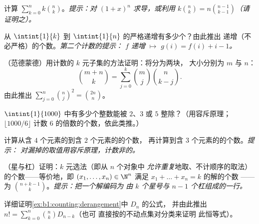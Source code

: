 \begin{exercise}[$\star$]\label{exo:b1:counting:5}
计算 $\sum_{k=0}^{n} k \binom{n}{k}$。\emph{提示：对
$(1 + x)^n$ 求导，或利用 $k \binom nk = n \binom{n-1}{k-1}$（请证明之）。}
\end{exercise}

\begin{exercise}[$\star\star$]\label{exo:b1:counting:6}
从 $\intint{1}{k}$ 到 $\intint{1}{n}$ 的严格递增有多少个？由此推出
递增（不必严格）的个数。\emph{第二个计数的提示：
$f$ 递增 $\mapsto$ $g(i) = f(i) + i - 1$。}
\end{exercise}

\begin{exercise}[$\star\star$]\label{exo:b1:counting:7}
（范德蒙德）用计数的 $k$ 元子集的方法证明：将分为两块，
大小分别为 $m$ 与 $n$：
\[
\binom{m+n}{k} = \sum_{j=0}^{k} \binom{m}{j} \binom{n}{k-j} .
\]
由此推出 $\sum_{j=0}^{n} \binom nj^2 = \binom{2n}{n}$。
\end{exercise}

\begin{exercise}[$\star\star$]\label{exo:b1:counting:8}
$\intint{1}{1000}$ 中有多少个整数能被
$2$、$3$ 或 $5$ 整除？（用容斥原理；$\lfloor 1000/6 \rfloor$
计数 $6$ 的倍数的个数，依此类推。）
\end{exercise}

\begin{exercise}[$\star\star$]\label{exo:b1:counting:9}
计算从含 $4$ 个元素的到含 $2$ 个元素的的个数，
再计算到含 $3$ 个元素的的个数。\emph{提示：
对漏掉的取值用容斥原理，计数非的。}
\end{exercise}

\begin{exercise}[$\star\star$]\label{exo:b1:counting:10}
（星与杠）证明：$k$ 元选法（即从 $n$ 个对象中
\emph{允许重复}地取、不计顺序的取法）的个数——等价地，即
$(x_1, \dots, x_n) \in \N^n$ 满足 $x_1 + \dots + x_n = k$ 的解的个数
——为 $\binom{n + k - 1}{k}$。\emph{提示：把一个解编码为
由 $k$ 个星号与 $n - 1$ 个杠组成的一行。}
\end{exercise}

\begin{exercise}[$\star\star\star$]\label{exo:b1:counting:11}
详细证明\cref{ex:b1:counting:derangement}中 $D_n$ 的公式，
并由此推出 $n! = \sum_{k=0}^{n} \binom{n}{k} D_{n-k}$（也可
直接按的不动点集对分类来证明
此恒等式）。
\end{exercise}

